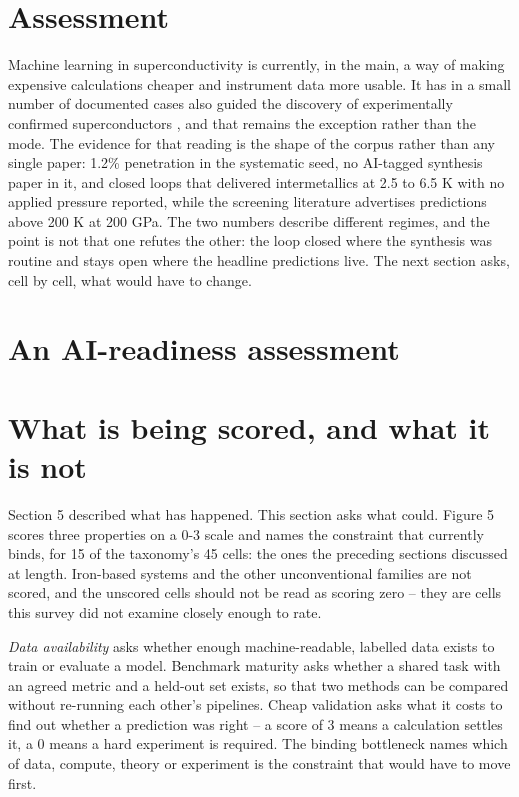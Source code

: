 \documentclass[
  11pt,
]{article}
\begin{document}
\section{Assessment}\label{assessment-2}

Machine learning in superconductivity is currently, in the main, a way
of making expensive calculations cheaper and instrument data more
usable. It has in a small number of documented cases also guided the
discovery of experimentally confirmed superconductors
\citep{pogue2022closed, li2026agentic}, and that remains the exception
rather than the mode. The evidence for that reading is the shape of the
corpus rather than any single paper: 1.2\% penetration in the systematic
seed, no AI-tagged synthesis paper in it, and closed loops that
delivered intermetallics at 2.5 to 6.5 K with no applied pressure
reported, while the screening literature advertises predictions above
200 K at 200 GPa. The two numbers describe different regimes, and the
point is not that one refutes the other: the loop closed where the
synthesis was routine and stays open where the headline predictions
live. The next section asks, cell by cell, what would have to change.

\section{An AI-readiness assessment}\label{an-ai-readiness-assessment}

\section{What is being scored, and what it is
not}\label{what-is-being-scored-and-what-it-is-not}

Section 5 described what has happened. This section asks what could.
Figure 5 scores three properties on a 0-3 scale and names the constraint
that currently binds, for 15 of the taxonomy's 45 cells: the ones the
preceding sections discussed at length. Iron-based systems and the other
unconventional families are not scored, and the unscored cells should
not be read as scoring zero -- they are cells this survey did not
examine closely enough to rate.

\emph{Data availability} asks whether enough machine-readable, labelled
data exists to train or evaluate a model. Benchmark maturity asks
whether a shared task with an agreed metric and a held-out set exists,
so that two methods can be compared without re-running each other's
pipelines. Cheap validation asks what it costs to find out whether a
prediction was right -- a score of 3 means a calculation settles it, a 0
means a hard experiment is required. The binding bottleneck names which
of data, compute, theory or experiment is the constraint that would have
to move first.
\end{document}
